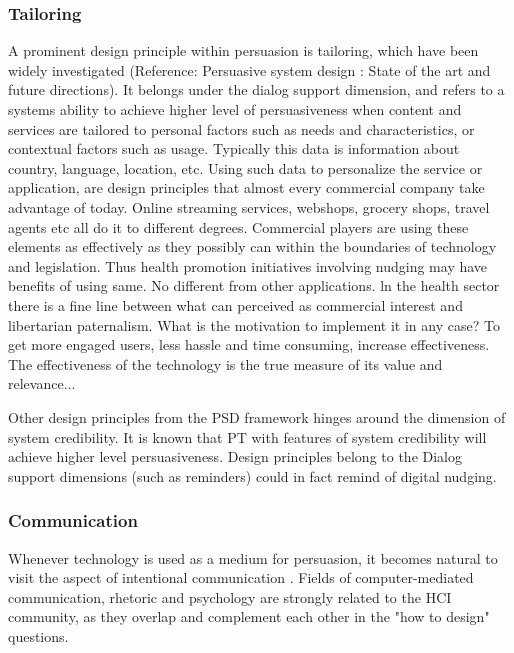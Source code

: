 \subsubsection{Tailoring}
A prominent design principle within persuasion is tailoring, which have been widely investigated (Reference: Persuasive system design : State of the art and future directions). It belongs under the dialog support dimension, and refers to a systems ability to achieve higher level of persuasiveness when content and services are tailored to personal factors such as needs and characteristics, or contextual factors such as usage. Typically this data is information about country, language, location, etc. Using such data to personalize the service or application, are design principles that almost every commercial company take advantage of today. Online streaming services, webshops, grocery shops, travel agents etc all do it to different degrees. Commercial players are using these elements as effectively as they possibly can within the boundaries of technology and legislation. Thus health promotion initiatives involving nudging may have benefits of using same. No different from other applications. ln the health sector there is a fine line between what can perceived as commercial interest and libertarian paternalism. What is the motivation to implement it in any case? To get more engaged users, less hassle and time consuming, increase effectiveness. The effectiveness of the technology is the true measure of its value and relevance...

Other design principles from the PSD framework hinges around the dimension of system credibility. It is known that PT with features of system credibility will achieve higher level persuasiveness. Design principles belong to the Dialog support dimensions (such as reminders) could in fact remind of digital nudging.
 
 \subsubsection{Communication}
Whenever technology is used as a medium for persuasion, it becomes natural to visit the aspect of intentional communication \cite{torning_pdf_2009}.
Fields of computer-mediated communication, rhetoric and psychology are strongly related to the HCI community, as they overlap and complement each other in the "how to design" questions. 



